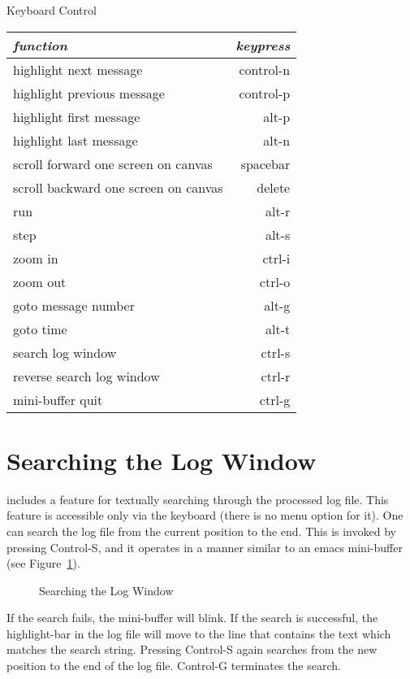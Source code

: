 Keyboard Control
\begin{tabular}{|l|r|} \hline
{\em function}			& {\em keypress} \\ \hline
highlight next message 		& control-n \\
highlight previous message  	& control-p \\
highlight first message		& alt-p \\
highlight last message 		& alt-n \\
scroll forward one screen on canvas & spacebar \\
scroll backward one screen on canvas & delete \\
run 				& alt-r \\
step	 			& alt-s \\
zoom in 	 		& ctrl-i \\
zoom out 			& ctrl-o \\
goto message number 		& alt-g \\
goto time	 		& alt-t \\
search log window	  	& ctrl-s \\ 
reverse search log window  	& ctrl-r \\ 
mini-buffer quit	 	& ctrl-g \\ \hline
\end{tabular}

\section{Searching the Log Window}

\comview{} includes a feature for textually searching through the processed
log file.  This feature is accessible only via the keyboard (there
is no menu option for it). One can search the log file from the
current position to the end. This is invoked by pressing Control-S,
and it operates in a manner similar to an emacs mini-buffer (see
Figure~\ref{fig:search}).

\begin{figure}[htp]
\centerline{\epsfysize=2in }
\caption{Searching the Log Window}
\label{fig:search}
\end{figure}

If the search fails, the mini-buffer will blink. If the search is
successful, the highlight-bar in the log file will move to the line
that contains the text which matches the search string. Pressing
Control-S again searches from the new position to the end of the log
file. Control-G terminates the search.

